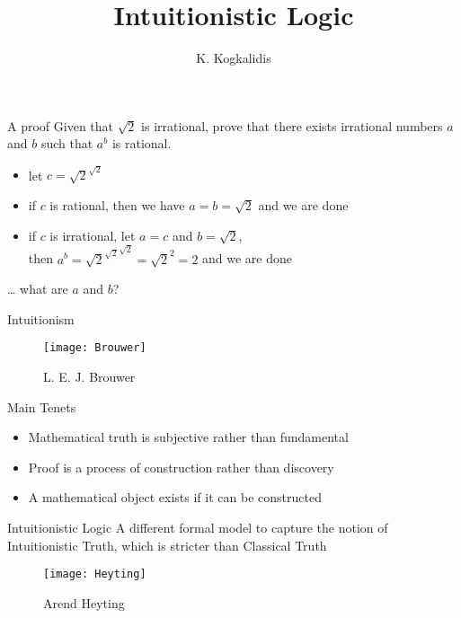 \documentclass{beamer}
\title{Intuitionistic Logic}
\author{K. Kogkalidis}
\institute{Logic \& Language 2020}
\begin{document}
\date{}
\maketitle

\begin{frame}{A proof}
Given that $\sqrt{2}$ is irrational, prove that there exists irrational numbers $a$ and $b$ such that $a^b$ is rational.
\pause
\begin{itemize}
	\item let $c=\sqrt{2}^{\sqrt{2}}$
	\pause
	\item if $c$ is rational, then we have $a=b=\sqrt{2}$ and we are done
	\pause
	\item if $c$ is irrational, let $a=c$ and $b=\sqrt{2}$,\\
	 then $a^b={\sqrt{2}^{\sqrt{2}}}^{\sqrt{2}} = \sqrt{2}^2=2$ and we are done
	\end{itemize}
	\vfill
	\pause
	
	\begin{center}
	\dots
	what are $a$ and $b$?
	\end{center}
\end{frame}

\begin{frame}{Intuitionism}

\begin{minipage}[t]{0.3\textwidth}
	\begin{figure}
	\texttt{[image: Brouwer]}
	\caption{L. E. J. Brouwer}
	\end{figure}
\end{minipage}%
\begin{minipage}[t]{0.7\textwidth}
	\begin{block}{Main Tenets}
	\begin{itemize}
		\item Mathematical truth is subjective rather than fundamental
		\item Proof is a process of construction rather than discovery
		\item A mathematical object exists if it can be constructed
	\end{itemize}
	\end{block}
\end{minipage}
\vfill
\pause

\begin{minipage}[t]{0.7\textwidth}
	\begin{block}{Intuitionistic Logic}
		A different formal model to capture the notion of Intuitionistic Truth, which is stricter
		than Classical Truth
	\end{block}
\end{minipage}%
\begin{minipage}[t]{0.3\textwidth}
\begin{figure}
\texttt{[image: Heyting]}
\caption{Arend Heyting}
\end{figure}
\end{minipage}
\end{frame}
\end{document}
